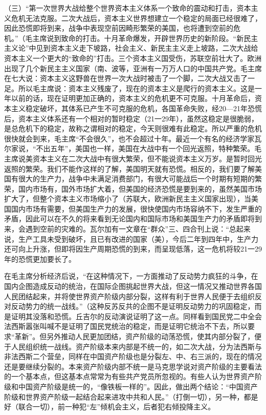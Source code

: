 （三）“第一次世界大战给整个世界资本主义体系一个致命的震动和打击，资本主义危机无法克服。二次大战后，资本主义世界想建立一个稳定的局面已经很难了，因此恐慌即将到来，战争中表现空前因畸形繁荣的美国，也将遭到空前的危机。”（毛主席说到致命的打击。十月革命爆发，开辟世界历史的新阶段。“新民主主义论”中见到资本主义走下坡路，社会主义、新民主主义走上坡路，二次大战给资本主义一个更大的“致命的”打击。三个资本主义国受伤，苏联空前壮大了。欧洲出现了几个新民主主义国家（南、波等，亚洲有一万万人口的中国共产党。毛主席在七大说：资本主义这野兽在世界一次大战时被击了一个脚，二次大战又击了一足。所以毛主席说：资本主义残废了，现在的资本主义是爬行的资本主义。这是一年以前的话，现在证明更加正确的，资本主义的危机更不可克服。十月革命后，资本主义稳定破坏，其体系已产生不可克服的危机，各国革命失败，经20—21年恐慌后，资本主义体系还有一个相对的暂时稳定（21一29年），虽然这稳定是很脆弱，是总危机下的稳定，故称之谓相对的稳定，今天则很难有此稳定。所以严重的危机很快就会到来，毛主席“不会很久”，也不会超过十年。最近一个有名的经济学家瓦尔家说，“不出五年”，美国也一样，美国在大战中有一个回光返照，特种繁荣。毛主席说美资本主义在二次大战中有很大繁荣，但不能说资本主义万岁。是暂时回光返照的繁荣。我们不能作这样的了解，美国明天就有恐慌。相反的，我们要了解美国有很大的生产力，战争中未满足消费部门，有很大可能战后一个时期有短期的繁荣，国内市场有，国外市场扩大着，但美国的经济恐慌是要到来的，虽然美国市场扩大了，但整个资本主义市场缩小了（苏联大，欧洲新民主主义国家出现），当美国国内市场有需要，但美国生产力的发展，很快使国内市场容纳不下，发生严重的矛盾，因此可以在不久的将来看到无论国内和国际市场和美国生产力的矛盾即将到来，会遇到空前的灾难的。瓦尔加有一文章在“群众”三、四合刊上说：“总起来说，生产工具未受到破坏，且已有改进的国家（美），今后二年到四年中，生产力还可向上升涨，但即将因生产周期恐慌的到来，而呈现低落，这一危机将较21一29年的恐慌更加要长了。

在毛主席分析经济后说，“在这种情况下，一方面推动了反动势力疯狂的斗争，在国内企图造成反动的统治，在国际企图挑起世界大战，但这一情况又推动世界各国人民团结起来，并将使世界资产阶级内部分裂，这样有利于世界人民便于去组织反对反动势力的统一战线。”（这种反苏反共的企图不是证明反动势力的巩固稳定，而是证明其没落和恐慌。丘吉尔的反动演说证明了这一点。同样看到国民党二中全会法西斯嚣张叫喊不是证明了国民党统治的稳定，而是证明它统治不下去，所以要求“革新”。但另外推动人民更加团结，资产阶级的动荡恐慌，使其内部分裂了，便于人民组织统一战线。资产阶级本来内部是不统一的，如二次大战，分为法西斯与非法西斯二个营垒，同样在中国资产阶级也是分裂左、中、右三派的，现在的情况还是要继续分裂的。本来资产阶级内部不统一是马克思学说对资产阶级的主要看法的一个基本点，但这基本点常常为有些共产党员所忽视的。有些人认为世界资产阶级和中国资产阶级是统一的，“像铁板一样的”。因此，做出两个结论：“中国资产阶级和世界资产阶级一起结合起来进攻中共和人民。”（打倒一切），另一种，都是好（联合一切），前一种犯“左”倾机会主义，后者犯右倾投降主义。

